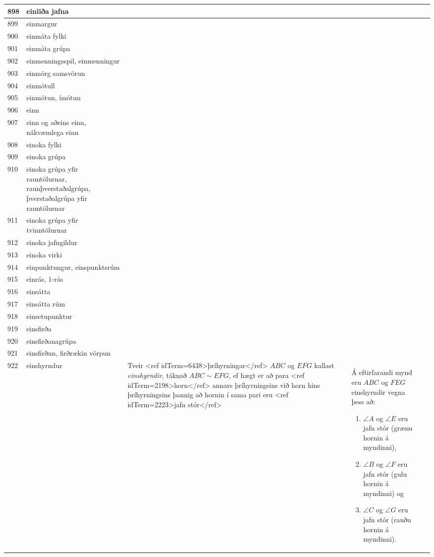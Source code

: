 \begin{longtable}{p{}|p{}|p{}|p{}|p{}}
\hline
898 & einliða jafna &  &  &  \\
\hline
899 & einmargur &  &  &  \\
\hline
900 & einmáta fylki &  &  &  \\
\hline
901 & einmáta grúpa &  &  &  \\
\hline
902 & einmenningsspil, einmenningur &  &  &  \\
\hline
903 & einmörg samsvörun &  &  &  \\
\hline
904 & einmótull &  &  &  \\
\hline
905 & einmótun, ímótun &  &  &  \\
\hline
906 & einn &  &  &  \\
\hline
907 & einn og aðeins einn, nákvæmlega einn &  &  &  \\
\hline
908 & einoka fylki &  &  &  \\
\hline
909 & einoka grúpa &  &  &  \\
\hline
910 & einoka grúpa yfir rauntölurnar, raunþverstaðalgrúpa, þverstaðalgrúpa yfir rauntölurnar &  &  &  \\
\hline
911 & einoka grúpa yfir tvinntölurnar &  &  &  \\
\hline
912 & einoka jafngildur &  &  &  \\
\hline
913 & einoka virki &  &  &  \\
\hline
914 & einpunktungur, einspunktsrúm &  &  &  \\
\hline
915 & einrás, \(1\)-rás &  &  &  \\
\hline
916 & einsátta &  &  &  \\
\hline
917 & einsátta rúm &  &  &  \\
\hline
918 & einsetupunktur &  &  &  \\
\hline
919 & einsfirða &  &  &  \\
\hline
920 & einsfirðanagrúpa &  &  &  \\
\hline
921 & einsfirðun, firðrækin vörpun &  &  &  \\
\hline
922 & einshyrndur & Tveir <ref idTerm=6438>þríhyrningar</ref> $ABC$ og $EFG$ kallast \textit{einshyrndir}, táknað $ABC \sim EFG$, ef hægt er að para <ref idTerm=2198>horn</ref> annars þríhyrningsins við horn hins þríhyrningsins þannig að hornin í sama pari eru <ref idTerm=2223>jafn stór</ref> & Á eftirfarandi mynd eru $ABC$ og $FEG$ einshyrndir vegna þess að:

\begin{enumerate}
    \item $\angle A$ og $\angle E$ eru jafn stór (grænu hornin á myndinni),
    \item $\angle B$ og $\angle F$ eru jafn stór (gulu hornin á myndinni) og
    \item $\angle C$ og $\angle G$ eru jafn stór (rauðu hornin á myndinni).
\end{enumerate}


\end{longtable}
